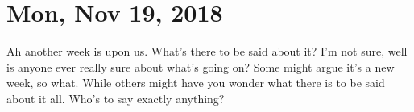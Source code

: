 \section{Mon, Nov 19, 2018}

Ah another week is upon us. What's there to be said about it? I'm not
sure, well is anyone ever really sure about what's going on? Some 
might argue it's a new week, so what. While others might have you wonder
what there is to be said about it all. Who's to say exactly anything?
